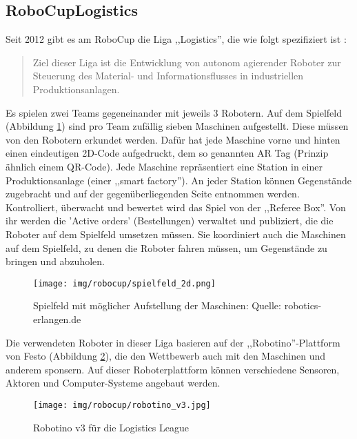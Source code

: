\subsection{RoboCupLogistics}
Seit 2012 gibt es am RoboCup die Liga ,,Logistics'', die wie folgt spezifiziert ist \cite{wikipedia-robocup}:
\begin{quote}
	Ziel dieser Liga ist die Entwicklung von autonom agierender Roboter zur Steuerung des Material- und Informationsflusses in industriellen Produktionsanlagen.
\end{quote}
Es spielen zwei Teams gegeneinander mit jeweils 3 Robotern. Auf dem  Spielfeld (Abbildung \ref{fig:robocup_spielfeld}) sind pro Team zufällig sieben Maschinen  aufgestellt. Diese müssen von den Robotern erkundet werden. Dafür hat jede Maschine vorne und hinten einen eindeutigen 2D-Code aufgedruckt, dem so genannten AR Tag (Prinzip ähnlich einem QR-Code). Jede Maschine repräsentiert eine Station in einer Produktionsanlage (einer ,,smart factory''). An jeder Station können Gegenstände zugebracht und auf der gegenüberliegenden Seite entnommen werden. Kontrolliert, überwacht und bewertet wird das Spiel von der ,,Referee Box''. Von ihr werden die 'Active orders' (Bestellungen) verwaltet und publiziert, die die Roboter auf dem Spielfeld umsetzen müssen. Sie koordiniert auch die Maschinen auf dem Spielfeld, zu denen die Roboter fahren müssen, um Gegenstände zu bringen und abzuholen.
\begin{figure}[H]
	\centering
	\texttt{[image: img/robocup/spielfeld\_2d.png]}
	\caption{Spielfeld mit möglicher Aufstellung der Maschinen: Quelle: robotics-erlangen.de \cite{robotics-erlangen.de}}
	\label{fig:robocup_spielfeld}
\end{figure}

Die verwendeten Roboter in dieser Liga basieren auf der ,,Robotino''-Plattform  von Festo (Abbildung \ref{fig:robotino}), die den Wettbewerb auch mit den Maschinen und anderem sponsern. Auf dieser Roboterplattform können verschiedene Sensoren, Aktoren und Computer-Systeme angebaut werden.
\begin{figure}[H]
	\centering
	\texttt{[image: img/robocup/robotino\_v3.jpg]}
	\caption{Robotino v3 für die Logistics League\cite{robotino}}
	\label{fig:robotino}
\end{figure}



